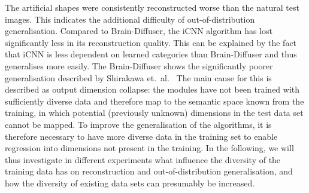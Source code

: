 The artificial shapes were consistently  reconstructed worse than the natural test images. This indicates the additional difficulty of out-of-distribution generalisation. Compared to Brain-Diffuser, the iCNN algorithm has lost significantly less in its reconstruction quality. This can be explained by the fact that iCNN is less dependent on learned categories than Brain-Diffuser and thus generalises more easily. The Brain-Diffuser shows the significantly poorer generalisation described by Shirakawa et.\ al.~\cite{shirakawaSpuriousReconstructionBrain2024} The main cause for this is described as output dimension collapse: the  modules have not been trained with sufficiently diverse data and therefore map to the semantic space known from the training, in which potential (previously unknown) dimensions in the test data set cannot be mapped. To improve the generalisation of the algorithms, it is therefore necessary to have more diverse data in the training set to enable regression into dimensions not present in the training. In the following, we will thus investigate in different experiments what influence the diversity of the training data has on reconstruction and out-of-distribution generalisation, and how the diversity of existing data sets can presumably be increased. 